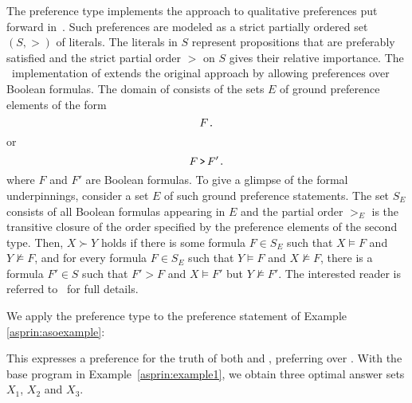 The preference type  implements the approach to qualitative preferences put forward in~\cite{giumar12a}.
Such preferences are modeled as a strict partially ordered set
\(
(S,>)
\)
of literals.
The literals in $S$ represent propositions that are preferably satisfied
and the strict partial order $>$ on $S$ gives their relative importance.
%
The \asprin\ implementation of  extends the original approach by allowing preferences over Boolean formulas.
The domain of  consists of the sets $E$ of ground preference elements of the form
\[F\texttt{.}\]
or 
\[F \, \texttt{>} \, F'\texttt{.}\]
where $F$ and $F'$ are Boolean formulas.
%
To give a glimpse of the formal underpinnings,
consider a set $E$ of such ground preference statements.
The set $S_E$ consists of all Boolean formulas appearing in $E$
and the partial order $>_E$ is the transitive closure of the order 
specified by the preference elements of the second type. 
Then, $X \succ Y$ holds if 
there is some formula $F \in S_E$ such that $X \models F$ and $Y \not\models F$, 
and for every formula $F \in S_E$ such that $Y \models F$ and $X \not\models F$, 
there is a formula
$F'\in S$ such that $F'>F$ and $X \models F'$ but $Y \not\models F'$.  The interested reader is referred to~\cite{giumar12a} for full details.  %
\begin{example}
%
%
We apply the preference type  to the preference statement of Example \ref{asprin:asoexample}:
%

%
This expresses a preference for the truth of both  and , 
preferring  over .
With the base program in Example~\ref{asprin:example1}, 
we obtain three optimal answer sets $X_1$, $X_2$ and $X_3$.  
\end{example} %

